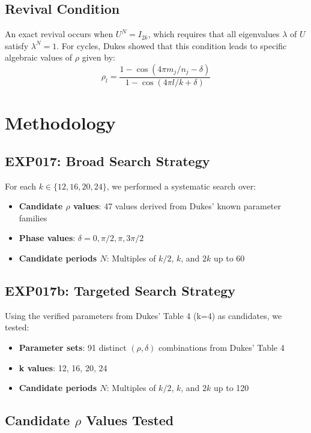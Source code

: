 \documentclass[12pt]{article}
\begin{document}
\subsection{Revival Condition}

An exact revival occurs when $U^N = I_{2k}$, which requires that all eigenvalues $\lambda$ of $U$ satisfy $\lambda^N = 1$. For cycles, Dukes showed that this condition leads to specific algebraic values of $\rho$ given by:
\[
\rho_l = \frac{1-\cos(4\pi m_j/n_j - \delta)}{1-\cos(4\pi l/k + \delta)}
\]

\section{Methodology}

\subsection{EXP017: Broad Search Strategy}

For each $k \in \{12, 16, 20, 24\}$, we performed a systematic search over:
\begin{itemize}
    \item \textbf{Candidate $\rho$ values}: 47 values derived from Dukes' known parameter families
    \item \textbf{Phase values}: $\delta = 0, \pi/2, \pi, 3\pi/2$
    \item \textbf{Candidate periods $N$}: Multiples of $k/2$, $k$, and $2k$ up to 60
\end{itemize}

\subsection{EXP017b: Targeted Search Strategy}

Using the verified parameters from Dukes' Table 4 (k=4) as candidates, we tested:
\begin{itemize}
    \item \textbf{Parameter sets}: 91 distinct $(\rho, \delta)$ combinations from Dukes' Table 4
    \item \textbf{k values}: 12, 16, 20, 24
    \item \textbf{Candidate periods $N$}: Multiples of $k/2$, $k$, and $2k$ up to 120
\end{itemize}

\subsection{Candidate $\rho$ Values Tested}
\end{document}
